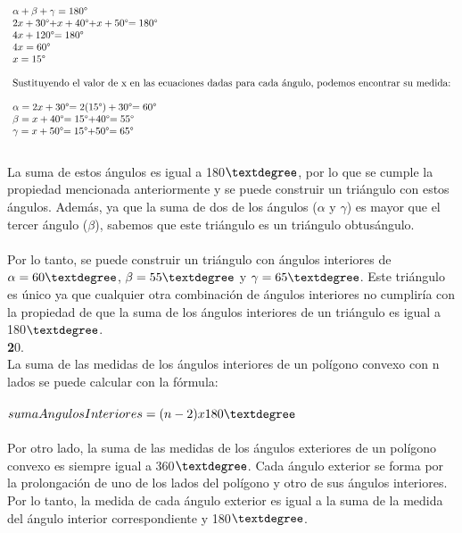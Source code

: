 \documentclass{article}
\begin{document}
\begin{equation}
\begin{array}{l}
\alpha + \beta + \gamma = 180$\textdegree$\\
2x + 30$\textdegree$ + x + 40$\textdegree$ + x + 50$\textdegree$ = 180$\textdegree$\\
4x + 120$\textdegree$ = 180$\textdegree$\\
4x = 60$\textdegree$\\
x = 15$\textdegree$\\
\\
\text{Sustituyendo el valor de x en las ecuaciones dadas para cada ángulo, podemos encontrar su medida:}\\
\\
\alpha = 2x + 30$\textdegree$ = 2(15$\textdegree$) + 30$\textdegree$ = 60$\textdegree$\\
\beta = x + 40$\textdegree$ = 15$\textdegree$ + 40$\textdegree$ = 55$\textdegree$\\
\gamma = x + 50$\textdegree$ = 15$\textdegree$ + 50$\textdegree$ = 65$\textdegree$\\
\end{array}
\end{equation}
\\
La suma de estos ángulos es igual a 180$\textdegree$, por lo que se cumple la propiedad mencionada anteriormente y se puede construir un triángulo con estos ángulos. Además, ya que la suma de dos de los ángulos ($\alpha$ y $\gamma$) es mayor que el tercer ángulo ($\beta$), sabemos que este triángulo es un triángulo obtusángulo.\\
\\
Por lo tanto, se puede construir un triángulo con ángulos interiores de $\alpha = 60\textdegree$, $\beta = 55\textdegree$ y $\gamma = 65\textdegree$. Este triángulo es único ya que cualquier otra combinación de ángulos interiores no cumpliría con la propiedad de que la suma de los ángulos interiores de un triángulo es igual a 180$\textdegree$.\\
{\textbf 20. }\\
La suma de las medidas de los ángulos interiores de un polígono convexo con n lados se puede calcular con la fórmula:\\
\\
$sumaAngulosInteriores = (n - 2) x 180\textdegree$\\
\\
Por otro lado, la suma de las medidas de los ángulos exteriores de un polígono convexo es siempre igual a 360$\textdegree$. Cada ángulo exterior se forma por la prolongación de uno de los lados del polígono y otro de sus ángulos interiores. Por lo tanto, la medida de cada ángulo exterior es igual a la suma de la medida del ángulo interior correspondiente y 180$\textdegree$.\\
\end{document}
